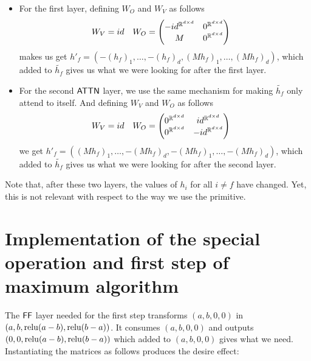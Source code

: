 \begin{itemize}
\item For the first layer, defining $W_O$ and $W_V$ as follows
%
\begin{align*}
    W_V &= id
    & 
    W_O &= \left(\begin{matrix}
                -id^{\mathbb{R}^{d \times d}}                 &0^{\mathbb{R}^{d \times d}}                   \\
                M                          &0^{\mathbb{R}^{d \times d}}                   
          \end{matrix}\right)
\end{align*}
%
makes us get $ h'_f = (-(h_f)_1, \dots, -(h_f)_d, (Mh_f)_1, \dots, (Mh_f)_d)$, which added to $\widetilde{h_f}$ gives us what we were looking for after the first layer.


\item For the second $\mathsf{ATTN}$ layer, we use the same mechanism for making $\widetilde{h_f}$ only attend to itself.
And defining $W_V$ and $W_O$ as follows
%
\begin{align*}
    W_V &= id
    & 
    W_O &= \left(\begin{matrix}
                0^{\mathbb{R}^{d \times d}}                   &id^{\mathbb{R}^{d \times d}}                  \\
                0^{\mathbb{R}^{d \times d}}                   &-id^{\mathbb{R}^{d \times d}}                 \\
          \end{matrix}\right)
\end{align*}
%
we get $ h'_f = ((Mh_f)_1, \dots, -(Mh_f)_d, -(Mh_f)_1, \dots, -(Mh_f)_d)$, which added to $\widetilde{h_f}$ gives us what we were looking for after the second layer.

\end{itemize}

\bigskip

Note that, after these two layers, the values of $h_i$ for all $i \neq f$ have changed. Yet, this is not relevant with respect to the way we use the primitive.





\section{Implementation of the special operation and first step of maximum algorithm}\label{appendix:special-op}

The $\mathsf{FF}$ layer needed for the first step transforms $(a, b, 0, 0)$ in $(a, b, \mathrm{relu}(a-b), \mathrm{relu}(b-a))$.
It consumes $(a, b, 0, 0)$ and outputs $(0, 0, \mathrm{relu}(a-b), \mathrm{relu}(b-a))$ which added to $(a, b, 0, 0)$ gives what we need.
Instantiating the matrices as follows produces the desire effect:

